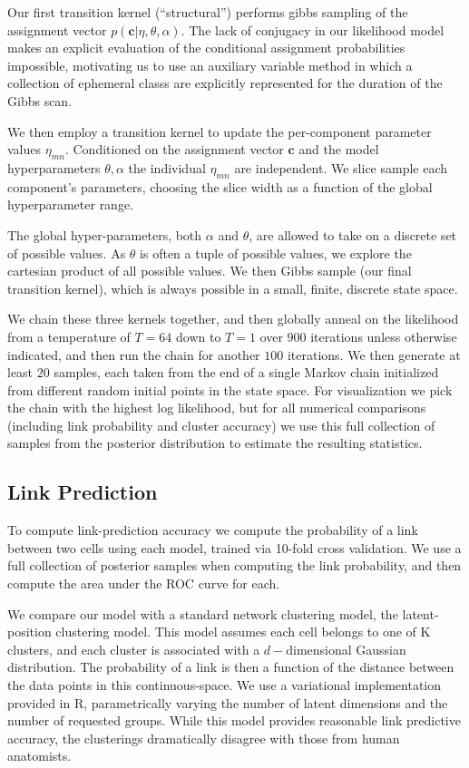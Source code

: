 \documentclass{article}
\renewcommand{\vec}[1]{\mathbf{#1}}
\begin{document}
Our first transition kernel (``structural'') performs gibbs sampling 
of the assignment vector $p(\vec{c} | \eta, \theta, \alpha)$. 
The lack of conjugacy in our likelihood model makes an explicit 
evaluation of the conditional assignment probabilities impossible, 
motivating us to use an auxiliary variable method \autocite{Neal2000}
in which a collection of ephemeral classs are explicitly represented
for the duration of the Gibbs scan. 

We then employ a transition kernel to update the per-component
parameter values $\eta_{mn}$. Conditioned on the assignment vector
$\vec{c}$ and the model hyperparameters $\theta, \alpha$ the 
individual $\eta_{mn}$ are independent. We slice sample \autocite{Neal2003}
each component's parameters, choosing the slice width as a function
of the global hyperparameter range. 

The global hyper-parameters, both $\alpha$ and $\theta$, are allowed
to take on a discrete set of possible values. As $\theta$ is often a
tuple of possible values, we explore the cartesian product of all
possible values. We then Gibbs sample (our final transition kernel),
which is always possible in a small, finite, discrete state space.

We chain these three kernels together, and then globally anneal on the
likelihood from a temperature of $T=64$ down to $T=1$ over $900$
iterations unless otherwise indicated, and then run the chain for
another $100$ iterations. We then generate at least $20$ samples, each
taken from the end of a single Markov chain initialized from different
random initial points in the state space. For visualization we pick the
chain with the highest log likelihood, but for all numerical
comparisons (including link probability and cluster accuracy) we use this full
collection of samples from the posterior distribution to estimate the
resulting statistics.

\subsection*{Link Prediction}
To compute link-prediction accuracy we compute the probability of a
link between two cells using each model, trained via 10-fold cross
validation.  We use a full collection of posterior samples when computing
the link probability, and then compute the area under the ROC curve
for each.


We compare our model with a standard network clustering model, the
latent-position clustering model. This model assumes each cell belongs
to one of K clusters, and each cluster is associated with a
$d-$dimensional Gaussian distribution. The probability of a link is
then a function of the distance between the data points in this
continuous-space. We use \autocite{Salter-Townshend2013} a variational
implementation provided in R, parametrically varying the number of
latent dimensions and the number of requested groups.  While this
model provides reasonable link predictive accuracy, the clusterings
dramatically disagree with those from human anatomists.
\end{document}
